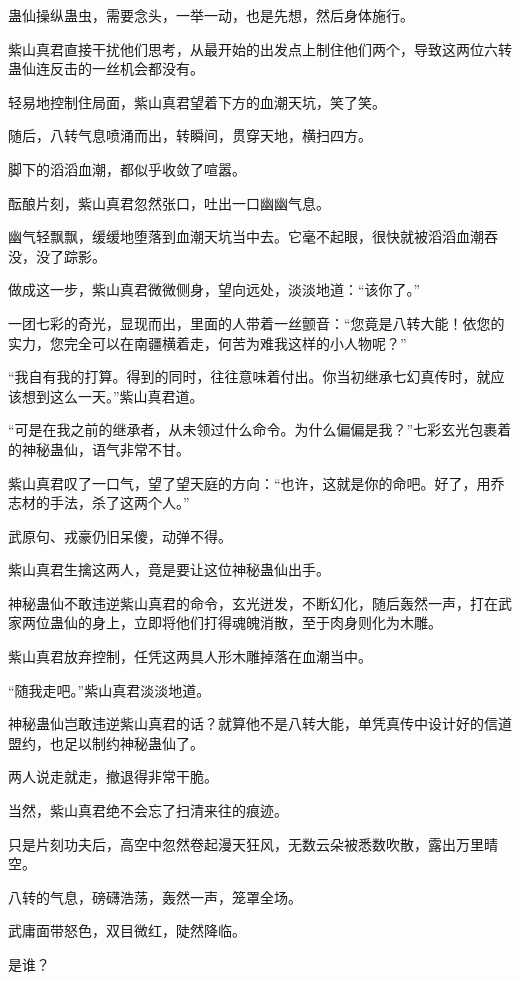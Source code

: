 \begin{this_body}
蛊仙操纵蛊虫，需要念头，一举一动，也是先想，然后身体施行。

紫山真君直接干扰他们思考，从最开始的出发点上制住他们两个，导致这两位六转蛊仙连反击的一丝机会都没有。

轻易地控制住局面，紫山真君望着下方的血潮天坑，笑了笑。

随后，八转气息喷涌而出，转瞬间，贯穿天地，横扫四方。

脚下的滔滔血潮，都似乎收敛了喧嚣。

酝酿片刻，紫山真君忽然张口，吐出一口幽幽气息。

幽气轻飘飘，缓缓地堕落到血潮天坑当中去。它毫不起眼，很快就被滔滔血潮吞没，没了踪影。

做成这一步，紫山真君微微侧身，望向远处，淡淡地道：“该你了。”

一团七彩的奇光，显现而出，里面的人带着一丝颤音：“您竟是八转大能！依您的实力，您完全可以在南疆横着走，何苦为难我这样的小人物呢？”

“我自有我的打算。得到的同时，往往意味着付出。你当初继承七幻真传时，就应该想到这么一天。”紫山真君道。

“可是在我之前的继承者，从未领过什么命令。为什么偏偏是我？”七彩玄光包裹着的神秘蛊仙，语气非常不甘。

紫山真君叹了一口气，望了望天庭的方向：“也许，这就是你的命吧。好了，用乔志材的手法，杀了这两个人。”

武原句、戎豪仍旧呆傻，动弹不得。

紫山真君生擒这两人，竟是要让这位神秘蛊仙出手。

神秘蛊仙不敢违逆紫山真君的命令，玄光迸发，不断幻化，随后轰然一声，打在武家两位蛊仙的身上，立即将他们打得魂魄消散，至于肉身则化为木雕。

紫山真君放弃控制，任凭这两具人形木雕掉落在血潮当中。

“随我走吧。”紫山真君淡淡地道。

神秘蛊仙岂敢违逆紫山真君的话？就算他不是八转大能，单凭真传中设计好的信道盟约，也足以制约神秘蛊仙了。

两人说走就走，撤退得非常干脆。

当然，紫山真君绝不会忘了扫清来往的痕迹。

只是片刻功夫后，高空中忽然卷起漫天狂风，无数云朵被悉数吹散，露出万里晴空。

八转的气息，磅礴浩荡，轰然一声，笼罩全场。

武庸面带怒色，双目微红，陡然降临。

是谁？


\end{this_body}
